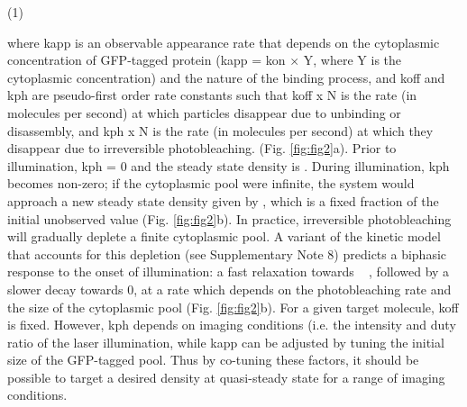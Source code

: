  
 (1)
 
 where kapp is an observable appearance rate that depends on the cytoplasmic concentration of GFP-tagged protein (kapp = kon × Y, where Y is the cytoplasmic concentration) and the nature of the binding process, and koff and kph are pseudo-first order rate constants such that koff x N is the rate (in molecules per second) at which particles disappear due to unbinding or disassembly, and kph x N is the rate (in molecules per second) at which they disappear due to irreversible photobleaching. (Fig. \ref{fig:fig2}a). Prior to illumination, kph = 0 and the steady state density is . During illumination, kph becomes non-zero; if the cytoplasmic pool were infinite, the system would approach a new steady state density given by , which is a fixed fraction of the initial unobserved value (Fig. \ref{fig:fig2}b). In practice, irreversible photobleaching will gradually deplete a finite cytoplasmic pool. A variant of the kinetic model that accounts for this depletion (see Supplementary Note 8) predicts a biphasic response to the onset of illumination: a fast relaxation towards ~ , followed by a slower decay towards 0, at a rate which depends on the photobleaching rate and the size of the cytoplasmic pool (Fig. \ref{fig:fig2}b). For a given target molecule, koff is fixed. However, kph depends on imaging conditions (i.e. the intensity and duty ratio of the laser illumination, while kapp can be adjusted by tuning the initial size of the GFP-tagged pool. Thus by co-tuning these factors, it should be possible to target a desired density at quasi-steady state for a range of imaging conditions.
 
 
 
